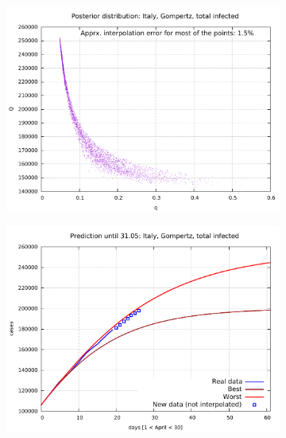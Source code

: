 \documentclass[8pt]{article}
\begin{document}
\begin{figure}[h!]
  \centering
  \begin{subfigure}[b]{0.5\linewidth}
  \includegraphics[width=\linewidth]{../it_g_t/posterior.pdf}
  \end{subfigure}
  \begin{subfigure}[b]{0.48\linewidth}
    \includegraphics[width=\linewidth]{../it_g_t/prediction.pdf}
  \end{subfigure}
  \begin{subfigure}[b]{0.48\linewidth}

\end{subfigure}
\end{figure}
\end{document}

